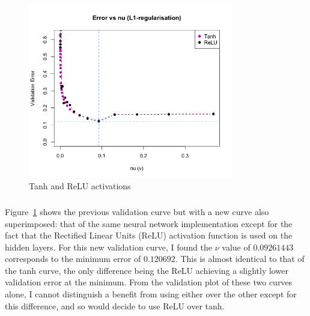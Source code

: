 \documentclass[12pt]{article}
\begin{document}
\begin{figure}[h]
\centering
\includegraphics[width=0.8\textwidth]{question_d_plot.png}
\caption{Tanh and ReLU activations}
\label{fig:fig2}
\end{figure}

\subsubsection{}
Figure~\ref{fig:fig2} shows the previous validation curve but with a new curve also superimposed: that of the same neural network implementation except for the fact that the Rectified Linear Units (ReLU) activation function is used on the hidden layers. For this new validation curve, I found the $\nu$ value of $0.09261443$ corresponds to the minimum error of $0.120692$. This is almost identical to that of the tanh curve, the only difference being the ReLU achieving a slightly lower validation error at the minimum. From the validation plot of these two curves alone, I cannot distinguish a benefit from using either over the other except for this difference, and so would decide to use ReLU over tanh.
\end{document}
